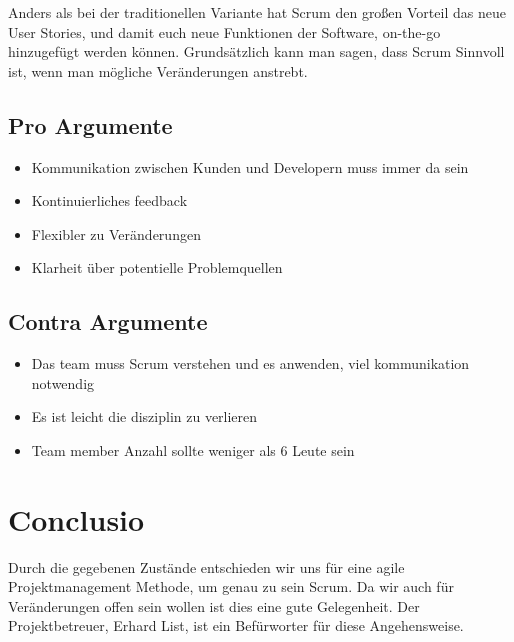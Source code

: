 Anders als bei der traditionellen Variante hat Scrum den großen Vorteil das neue User Stories, und damit euch neue Funktionen der Software, on-the-go hinzugefügt werden können. Grundsätzlich kann man sagen, dass Scrum Sinnvoll ist, wenn man mögliche Veränderungen anstrebt.

\subsection{Pro Argumente}
\begin{itemize}
		\item Kommunikation zwischen Kunden und Developern muss immer da sein
		\item Kontinuierliches feedback
		\item Flexibler zu Veränderungen
		\item Klarheit über potentielle Problemquellen
\end{itemize}

\subsection{Contra Argumente}
\begin{itemize}
		\item Das team muss Scrum verstehen und es anwenden, viel kommunikation notwendig
		\item Es ist leicht die disziplin zu verlieren
		\item Team member Anzahl sollte weniger als 6 Leute sein
\end{itemize}


\section{Conclusio}
Durch die gegebenen Zustände entschieden wir uns für eine agile Projektmanagement Methode, um genau zu sein Scrum. Da wir auch für Veränderungen offen sein wollen ist dies eine gute Gelegenheit. Der Projektbetreuer, Erhard List, ist ein Befürworter für diese Angehensweise. 
